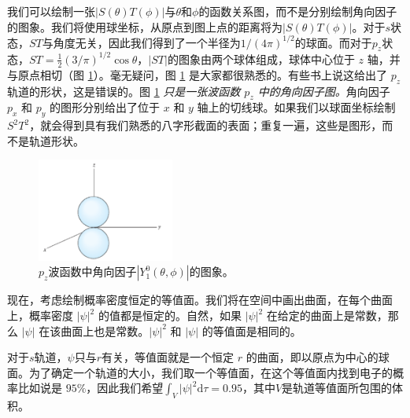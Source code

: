     我们可以绘制一张$\left|S\left(\theta\right)T\left(\phi\right)\right|$与$\theta$和$\phi$的函数关系图，而不是分别绘制角向因子的图象。我们将使用球坐标，从原点到图上点的距离将为$\left|S\left(\theta\right)T\left(\phi\right)\right|$。对于$s$状态，$ST$与角度无关，因此我们得到了一个半径为$1/\left(4\pi\right)^{1/2}$的球面。而对于$p_z$状态，$ST = \frac{1}{2}\left(3/\pi\right)^{1/2}\cos\theta$，$\left|ST\right|$的图象由两个球体组成，球体中心位于 $z$ 轴，并与原点相切（图 \ref{fig:6.11}）。毫无疑问，图 \ref{fig:6.11} 是大家都很熟悉的。有些书上说这给出了 $p_z$ 轨道的形状，这是错误的。图 \ref{fig:6.11} \textit{只是一张波函数 $p_z$ 中的角向因子图。}角向因子 $p_x$ 和 $p_y$ 的图形分别给出了位于 $x$ 和 $y$ 轴上的切线球。如果我们以球面坐标绘制 $S^2T^2$，就会得到具有我们熟悉的八字形截面的表面；重复一遍，这些是图形，而不是轨道形状。
    \begin{figure}[ht]
        \centering
        \includegraphics[width=0.4\textwidth]{Figures/6.11.png}
        \caption{
            $p_z$波函数中角向因子$\left|Y_1^0\left(\theta,\phi\right)\right|$的图象。
        }
        \label{fig:6.11}
    \end{figure}

    现在，考虑绘制概率密度恒定的等值面。我们将在空间中画出曲面，在每个曲面上，概率密度 $\left|\psi\right|^2$ 的值都是恒定的。自然，如果 $\left|\psi\right|^2$ 在给定的曲面上是常数，那么 $\left|\psi\right|$ 在该曲面上也是常数。$\left|\psi\right|^2$ 和 $\left|\psi\right|$ 的等值面是相同的。

    对于$s$轨道，$\psi$只与$r$有关，等值面就是一个恒定 $r$ 的曲面，即以原点为中心的球面。为了确定一个轨道的大小，我们取一个等值面，在这个等值面内找到电子的概率比如说是 $95\%$，因此我们希望$\int_{V}\left|\psi\right|^2\mathrm{d}\tau = 0.95$，其中$V$是轨道等值面所包围的体积。

